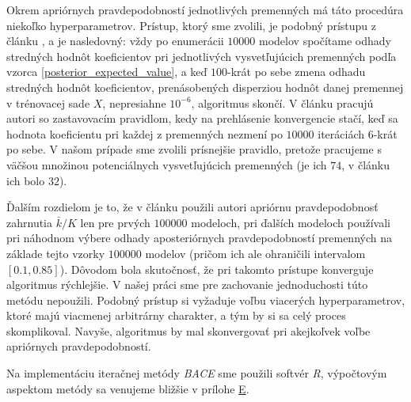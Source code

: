 Okrem apriórnych pravdepodobností jednotlivých premenných má táto procedúra niekoľko hyperparametrov.
Prístup, ktorý sme zvolili, je podobný prístupu z článku \cite{sala-i-martin}, a je nasledovný:
vždy po enumerácii \(10000\) modelov spočítame odhady stredných hodnôt koeficientov pri jednotlivých vysvetľujúcich premenných podľa vzorca \ref{posterior_expected_value},
a keď \(100\)-krát po sebe zmena odhadu stredných hodnôt koeficientov, prenásobených disperziou hodnôt danej premennej v trénovacej sade \(X\),
nepresiahne \(10^{-6}\), algoritmus skončí.
V článku \cite{sala-i-martin} pracujú autori so zastavovacím pravidlom, kedy na prehlásenie konvergencie stačí,
keď sa hodnota koeficientu pri každej z premenných nezmení po \(10000\) iteráciách \(6\)-krát po sebe.
V našom prípade sme zvolili prísnejšie pravidlo, pretože pracujeme s väčšou množinou potenciálnych vysvetľujúcich premenných
(je ich \(74\), v článku \cite{sala-i-martin} ich bolo \(32\)).

Ďalším rozdielom je to, že v článku \cite{sala-i-martin} použili autori apriórnu pravdepodobnosť zahrnutia \( \bar{k}/K \) len pre prvých \(100000\) modeloch,
pri ďalších modeloch používali pri náhodnom výbere odhady aposteriórnych pravdepodobností premenných na základe tejto vzorky \(100000\) modelov
(pričom ich ale ohraničili intervalom \([0.1, 0.85]\)).
Dôvodom bola skutočnosť, že pri takomto prístupe konverguje algoritmus rýchlejšie.
V našej práci sme pre zachovanie jednoduchosti túto metódu nepoužili.
Podobný prístup si vyžaduje voľbu viacerých hyperparametrov, ktoré majú viacmenej arbitrárny charakter, a tým by si sa celý proces skomplikoval.
Navyše, algoritmus by mal skonvergovať pri akejkoľvek voľbe apriórnych pravdepodobností.

Na implementáciu iteračnej metódy \emph{BACE} sme použili softvér \emph{R}, výpočtovým aspektom metódy sa venujeme bližšie v prílohe \hyperref[appendix:e]{E}.


